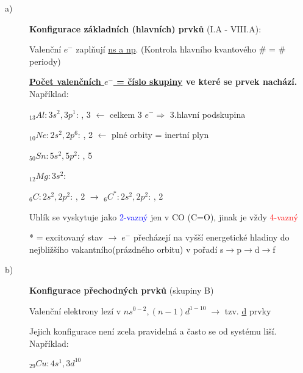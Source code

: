 \begin{description}
    \item[a)] \textbf{Konfigurace základních (hlavních) prvků} (I.A - VIII.A):
    
        Valenční $e^-$ zaplňují \underline{ns a np}. (Kontrola hlavního kvantového \# = \# periody)
        
        \medskip
        \textbf{\underline{Počet valenčních $e^-$ = číslo skupiny} ve které se prvek nachází.} Například:

        \(_{13}Al: 3s^2, 3p^1\):  \fbox{$\downarrow\uparrow$}, 3 \fbox{$\downarrow$ }\fbox{\phantom{$\uparrow$ }}\fbox{\phantom{$\uparrow$ }} $\longleftarrow$ celkem 3 $e^- \Rightarrow$ 3.hlavní podskupina
        
        \(_{10}Ne: 2s^2, 2p^6\):  \fbox{$\downarrow\uparrow$}, 2 \fbox{$\downarrow\uparrow$}\fbox{$\downarrow\uparrow$}\fbox{$\downarrow\uparrow$} $\longleftarrow$ plné orbity = inertní plyn
        
        \begin{multicols}{2}
            \(_{50}Sn: 5s^2, 5p^2\):  \fbox{$\downarrow\uparrow$}, 5 \fbox{$\downarrow$ }\fbox{$\downarrow$ }\fbox{\phantom{$\uparrow$ }}
    
            \(_{12}Mg: 3s^2\):  \fbox{$\downarrow\uparrow$}
        \end{multicols}

        \(_{6}C: 2s^2, 2p^2\):  \fbox{$\downarrow\uparrow$}, 2 \fbox{\textcolor{blue}{$\downarrow$} }\fbox{\textcolor{blue}{$\downarrow$} }\fbox{\phantom{$\uparrow$ }} $\longrightarrow$
        \(_{6}C^*: 2s^2, 2p^2\):  \fbox{\textcolor{red}{$\downarrow$} }, 2 \fbox{\textcolor{red}{$\downarrow$} }\fbox{\textcolor{red}{$\downarrow$} }\fbox{\textcolor{red}{$\downarrow$} }

        Uhlík se vyskytuje jako \textcolor{blue}{2-vazný} jen v CO (C=O), jinak je vždy \textcolor{red}{4-vazný}
    
        * = excitovaný stav $\to \; e^-$ přecházejí na vyšší energetické hladiny do nejbližšího vakantního(prázdného orbitu) v pořadí s$\to$p$\to$d$\to$f
    
    \item[b)] \textbf{Konfigurace přechodných prvků} (skupiny B)

        Valenční elektrony lezí v \underline{$ns^{0-2}, (n-1)d^{1-10} \; \longrightarrow$} tzv. \underline{d} prvky
        
        Jejich konfigurace není zcela pravidelná a často se od systému liší. Například:
        \begin{multicols}{2}
            \(_{29}Cu: 4s^1, 3d^{10}\)
    

\end{multicols}
\end{description}
